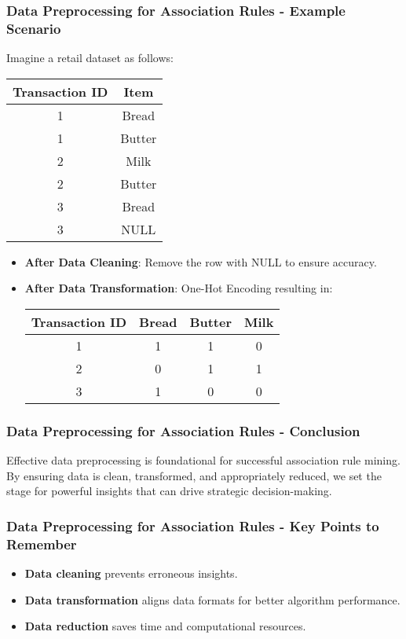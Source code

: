 \documentclass{beamer}
\begin{document}
\begin{frame}[fragile]
    \frametitle{Data Preprocessing for Association Rules - Example Scenario}
    Imagine a retail dataset as follows:
    
    \begin{tabular}{|c|c|}
        \hline
        \textbf{Transaction ID} & \textbf{Item} \\
        \hline
        1 & Bread \\
        1 & Butter \\
        2 & Milk \\
        2 & Butter \\
        3 & Bread \\
        3 & NULL \\
        \hline
    \end{tabular}

    \begin{itemize}
        \item \textbf{After Data Cleaning}: Remove the row with NULL to ensure accuracy.
        \item \textbf{After Data Transformation}: One-Hot Encoding resulting in:

        \begin{tabular}{|c|c|c|c|}
            \hline
            \textbf{Transaction ID} & \textbf{Bread} & \textbf{Butter} & \textbf{Milk} \\
            \hline
            1 & 1 & 1 & 0 \\
            2 & 0 & 1 & 1 \\
            3 & 1 & 0 & 0 \\
            \hline
        \end{tabular}
    \end{itemize}
\end{frame}

\begin{frame}[fragile]
    \frametitle{Data Preprocessing for Association Rules - Conclusion}
    Effective data preprocessing is foundational for successful association rule mining. By ensuring data is clean, transformed, and appropriately reduced, we set the stage for powerful insights that can drive strategic decision-making.
\end{frame}

\begin{frame}[fragile]
    \frametitle{Data Preprocessing for Association Rules - Key Points to Remember}
    \begin{itemize}
        \item \textbf{Data cleaning} prevents erroneous insights.
        \item \textbf{Data transformation} aligns data formats for better algorithm performance.
        \item \textbf{Data reduction} saves time and computational resources.
    \end{itemize}
\end{frame}
\end{document}
